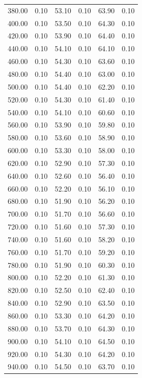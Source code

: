 \documentclass[a4paper,11pt]{article}
\begin{document}
\begin{longtable}{rrrrrr}
    380.00 & 0.10 & 53.10 & 0.10 & 63.90 & 0.10 \\
    400.00 & 0.10 & 53.50 & 0.10 & 64.30 & 0.10 \\
    420.00 & 0.10 & 53.90 & 0.10 & 64.40 & 0.10 \\
    440.00 & 0.10 & 54.10 & 0.10 & 64.10 & 0.10 \\
    460.00 & 0.10 & 54.30 & 0.10 & 63.60 & 0.10 \\
    480.00 & 0.10 & 54.40 & 0.10 & 63.00 & 0.10 \\
    500.00 & 0.10 & 54.40 & 0.10 & 62.20 & 0.10 \\
    520.00 & 0.10 & 54.30 & 0.10 & 61.40 & 0.10 \\
    540.00 & 0.10 & 54.10 & 0.10 & 60.60 & 0.10 \\
    560.00 & 0.10 & 53.90 & 0.10 & 59.80 & 0.10 \\
    580.00 & 0.10 & 53.60 & 0.10 & 58.90 & 0.10 \\
    600.00 & 0.10 & 53.30 & 0.10 & 58.00 & 0.10 \\
    620.00 & 0.10 & 52.90 & 0.10 & 57.30 & 0.10 \\
    640.00 & 0.10 & 52.60 & 0.10 & 56.40 & 0.10 \\
    660.00 & 0.10 & 52.20 & 0.10 & 56.10 & 0.10 \\
    680.00 & 0.10 & 51.90 & 0.10 & 56.20 & 0.10 \\
    700.00 & 0.10 & 51.70 & 0.10 & 56.60 & 0.10 \\
    720.00 & 0.10 & 51.60 & 0.10 & 57.30 & 0.10 \\
    740.00 & 0.10 & 51.60 & 0.10 & 58.20 & 0.10 \\
    760.00 & 0.10 & 51.70 & 0.10 & 59.20 & 0.10 \\
    780.00 & 0.10 & 51.90 & 0.10 & 60.30 & 0.10 \\
    800.00 & 0.10 & 52.20 & 0.10 & 61.30 & 0.10 \\
    820.00 & 0.10 & 52.50 & 0.10 & 62.40 & 0.10 \\
    840.00 & 0.10 & 52.90 & 0.10 & 63.50 & 0.10 \\
    860.00 & 0.10 & 53.30 & 0.10 & 64.20 & 0.10 \\
    880.00 & 0.10 & 53.70 & 0.10 & 64.30 & 0.10 \\
    900.00 & 0.10 & 54.10 & 0.10 & 64.50 & 0.10 \\
    920.00 & 0.10 & 54.30 & 0.10 & 64.20 & 0.10 \\
    940.00 & 0.10 & 54.50 & 0.10 & 63.70 & 0.10 \\

\end{longtable}
\end{document}
